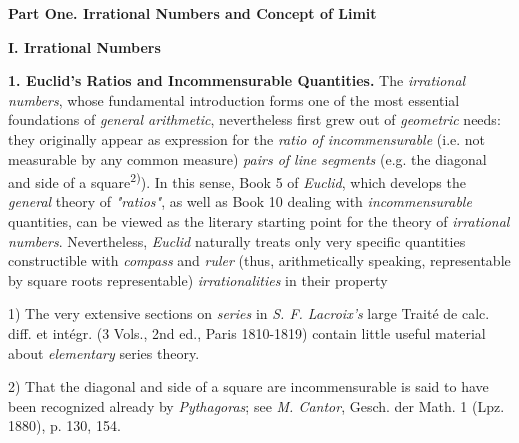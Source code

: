 \begin{center}
{\fontsize{13}{13}\selectfont\textbf{Part One. Irrational Numbers and Concept of Limit}}

{\fontsize{12}{12}\selectfont\textbf{I. Irrational Numbers}}
\end{center}

{\fontsize{11}{11}\selectfont\textbf{1. Euclid's Ratios and Incommensurable Quantities.}} The \textit{irrational numbers}, whose fundamental introduction forms one of the most essential foundations of \textit{general arithmetic}, nevertheless first grew out of \textit{geometric} needs: they originally appear as expression for the \textit{ratio of incommensurable} (i.e. not measurable by any common measure) \textit{pairs of line segments} (e.g. the diagonal and side of a square\textsuperscript{2)}). In this sense, Book 5 of \textit{Euclid}, which develops the \textit{general} theory of \textit{"ratios"}, as well as Book 10 dealing with \textit{incommensurable} quantities, can be viewed as the literary starting point for the theory of \textit{irrational numbers}. Nevertheless, \textit{Euclid} naturally treats only very specific quantities constructible with \textit{compass} and \textit{ruler} (thus, arithmetically speaking, representable by square roots representable) \textit{irrationalities} in their property

\vfill
\leftline{\rule{2in}{0.4pt}}
\vspace{0.2cm}
{
\footnotesize
1) The very extensive sections on \textit{series} in \textit{S. F. Lacroix's} large Traité de calc. diff. et intégr. (3 Vols., 2nd ed., Paris 1810-1819) contain little useful material about \textit{elementary} series theory.

2) That the diagonal and side of a square are incommensurable is said to have been recognized already by \textit{Pythagoras}; see \textit{M. Cantor}, Gesch. der Math. 1 (Lpz. 1880), p. 130, 154.

}
